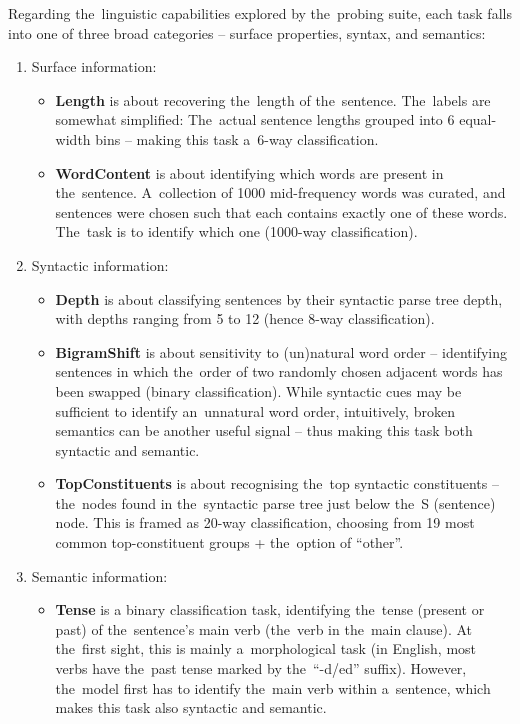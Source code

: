 \documentclass[bsc,frontabs,singlespacing,parskip,deptreport]{infthesis}
\begin{document}
{{    Regarding the~linguistic capabilities explored by the~probing suite, each task falls into one of three broad categories -- surface properties, syntax, and semantics:
    \begin{enumerate}
      \item {Surface information:
        \begin{itemize}
          \item \textbf{Length} is about recovering the~length of the~sentence. The~labels are somewhat simplified: The~actual sentence lengths grouped into 6 equal-width bins -- making this task a~6-way classification.
          \item \textbf{WordContent} is about identifying which words are present in the~sentence. A~collection of 1000 mid-frequency words was curated, and sentences were chosen such that each contains exactly one of these words. The~task is to identify which one (1000-way classification).
        \end{itemize}
      }
      \item{Syntactic information:
        \begin{itemize}
          \item \textbf{Depth} is about classifying sentences by their syntactic parse tree depth, with depths ranging from 5 to 12 (hence 8-way classification).
          \item \textbf{BigramShift} is about sensitivity to (un)natural word order -- identifying sentences in which the~order of two randomly chosen adjacent words has been swapped (binary classification). While syntactic cues may be sufficient to identify an~unnatural word order, intuitively, broken semantics can be another useful signal -- thus making this task both syntactic and semantic.
          \item \textbf{TopConstituents} is about recognising the~top syntactic constituents -- the~nodes found in the~syntactic parse tree just below the~S (sentence) node. This is framed as 20-way classification, choosing from 19 most common top-constituent groups + the~option of ``other''.
        \end{itemize}
      }
      \item{Semantic information:
        \begin{itemize}
          \item \textbf{Tense} is a binary classification task, identifying the~tense (present or past) of the~sentence's main verb (the~verb in the~main clause). At the~first sight, this is mainly a~morphological task (in English, most verbs have the~past tense marked by the~``-d/ed'' suffix). However, the~model first has to identify the~main verb within a~sentence, which makes this task also syntactic and semantic.

\end{itemize}}
\end{enumerate}}}
\end{document}
